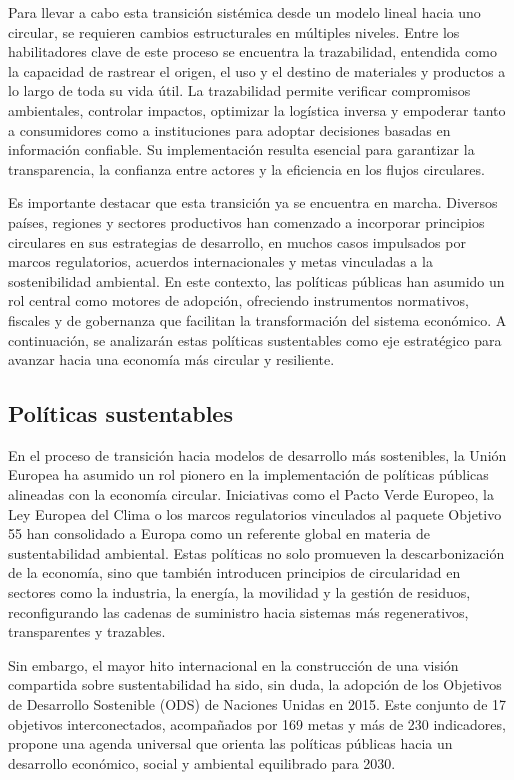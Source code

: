 Para llevar a cabo esta transición sistémica desde un modelo lineal hacia uno circular, se requieren cambios estructurales en múltiples niveles. Entre los habilitadores clave de este proceso se encuentra la trazabilidad, entendida como la capacidad de rastrear el origen, el uso y el destino de materiales y productos a lo largo de toda su vida útil. La trazabilidad permite verificar compromisos ambientales, controlar impactos, optimizar la logística inversa y empoderar tanto a consumidores como a instituciones para adoptar decisiones basadas en información confiable. Su implementación resulta esencial para garantizar la transparencia, la confianza entre actores y la eficiencia en los flujos circulares.

Es importante destacar que esta transición ya se encuentra en marcha. Diversos países, regiones y sectores productivos han comenzado a incorporar principios circulares en sus estrategias de desarrollo, en muchos casos impulsados por marcos regulatorios, acuerdos internacionales y metas vinculadas a la sostenibilidad ambiental. En este contexto, las políticas públicas han asumido un rol central como motores de adopción, ofreciendo instrumentos normativos, fiscales y de gobernanza que facilitan la transformación del sistema económico. A continuación, se analizarán estas políticas sustentables como eje estratégico para avanzar hacia una economía más circular y resiliente.

\subsection{Políticas sustentables}

En el proceso de transición hacia modelos de desarrollo más sostenibles, la Unión Europea ha asumido un rol pionero en la implementación de políticas públicas alineadas con la economía circular. Iniciativas como el Pacto Verde Europeo, la Ley Europea del Clima o los marcos regulatorios vinculados al paquete Objetivo 55 han consolidado a Europa como un referente global en materia de sustentabilidad ambiental. Estas políticas no solo promueven la descarbonización de la economía, sino que también introducen principios de circularidad en sectores como la industria, la energía, la movilidad y la gestión de residuos, reconfigurando las cadenas de suministro hacia sistemas más regenerativos, transparentes y trazables.

Sin embargo, el mayor hito internacional en la construcción de una visión compartida sobre sustentabilidad ha sido, sin duda, la adopción de los Objetivos de Desarrollo Sostenible (ODS) de Naciones Unidas en 2015. Este conjunto de 17 objetivos interconectados, acompañados por 169 metas y más de 230 indicadores, propone una agenda universal que orienta las políticas públicas hacia un desarrollo económico, social y ambiental equilibrado para 2030.

